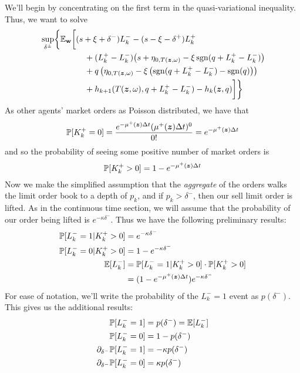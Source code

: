 We'll begin by concentrating on the first term in the quasi-variational inequality. Thus, we want to solve
\begin{equation}
\label{eq:discretesup1}
\begin{split}
& \sup_{\delta^\pm} \biggl\lbrace \E_{\bw} \biggl[
(s + \xi + \delta^-)L_k^- - (s - \xi - \delta^+)L_k^+ \\
& \hphantom{\sup_{\bu} \biggl\lbrace \E_{\bw} \biggl[ {}+{}} + (L_k^+ - L_k^-) \bigl( s + \eta_{0,T(\bz, \omega)}  -\xi\sgn( q + L_k^+ - L_k^-)   \bigr) \\
& \hphantom{\sup_{\bu} \biggl\lbrace \E_{\bw} \biggl[ {}+{}} + q\left( \eta_{0,T(\bz, \omega)}  -\xi\left( \sgn( q + L_k^+ - L_k^-) - \sgn(q) \right)  \right) \\
& \hphantom{\sup_{\bu} \biggl\lbrace \E_{\bw} \biggl[ {}+{}} + h_{k+1}(T(\bz,\omega), q + L_k^+ - L_k^- ) -  h_k(\bz,q) \biggr] \biggr\rbrace
\end{split}
\end{equation}
As other agents' market orders as Poisson distributed, we have that 
\begin{equation}
\mathbb{P} [ K_k^+ = 0] = \frac{e^{-\mu^+ (\bm{z}) \Delta t} (\mu^+ (\bm{z}) \Delta t)^0}{0!} = e^{-\mu^+ (\bm{z}) \Delta t}
\end{equation}
and so the probability of seeing some positive number of market orders is
\begin{equation}
\label{eq:discretepositiveKplus}
\mathbb{P} [ K_k^+ > 0] = 1 - e^{-\mu^+ (\bm{z}) \Delta t}
\end{equation}
Now we make the simplified assumption that the \textit{aggregate} of the orders walks the limit order book to a depth of $p_k$, and if $p_k > \delta^-$, then our sell limit order is lifted. As in the continuous time section, we will assume that the probability of our order being lifted is $e^{-\kappa \delta^-}$. Thus we have the following preliminary results:
\begin{align}
\mathbb{P} [ L_k^- = 1 | K_k^+ > 0] & = e^{-\kappa \delta^-} \\
\mathbb{P} [ L_k^- = 0 | K_k^+ > 0] & = 1 - e^{-\kappa \delta^-} \\
\mathbb{E} [ L_k^- ] & = \mathbb{P} [ L_k^- = 1 | K_k^+ > 0] \cdot \mathbb{P}[K_k^+ > 0] \\
& = ( 1 - e^{-\mu^+ (\bm{z}) \Delta t} ) e^{-\kappa \delta^-}
\end{align}
For ease of notation, we'll write the probability of the $L_k^- = 1$ event as $p(\delta^-)$. This gives us the additional results:
\begin{align}
\mathbb{P} [ L_k^- = 1] & = p(\delta^-) = \mathbb{E} [ L_k^-] \\
\mathbb{P} [ L_k^- = 0] & = 1 - p(\delta^-) \\
\partial_{\delta^-} \mathbb{P} [ L_k^- = 1]  & = -\kappa p(\delta^-) \\
\partial_{\delta^-} \mathbb{P} [ L_k^- = 0] & = \kappa p(\delta^-)
\end{align}
